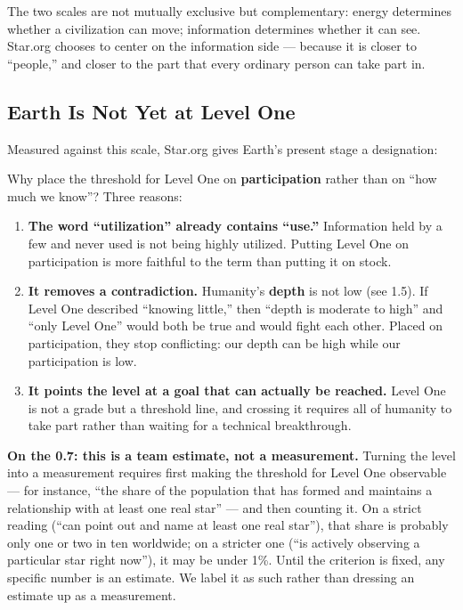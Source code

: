 \documentclass[11pt,fontset=none]{ctexart}
\begin{document}
The two scales are not mutually exclusive but complementary: energy determines whether a civilization can move; information determines whether it can see. Star.org chooses to center on the information side — because it is closer to ``people,'' and closer to the part that every ordinary person can take part in.

\subsection{Earth Is Not Yet at Level One}

Measured against this scale, Star.org gives Earth's present stage a designation:


Why place the threshold for Level One on \textbf{participation} rather than on ``how much we know''? Three reasons:

\begin{enumerate}
  \item \textbf{The word ``utilization'' already contains ``use.''} Information held by a few and never used is not being highly utilized. Putting Level One on participation is more faithful to the term than putting it on stock.
  \item \textbf{It removes a contradiction.} Humanity's \textbf{depth} is not low (see 1.5). If Level One described ``knowing little,'' then ``depth is moderate to high'' and ``only Level One'' would both be true and would fight each other. Placed on participation, they stop conflicting: our depth can be high while our participation is low.
  \item \textbf{It points the level at a goal that can actually be reached.} Level One is not a grade but a threshold line, and crossing it requires all of humanity to take part rather than waiting for a technical breakthrough.
\end{enumerate}

\textbf{On the 0.7: this is a team estimate, not a measurement.} Turning the level into a measurement requires first making the threshold for Level One observable --- for instance, ``the share of the population that has formed and maintains a relationship with at least one real star'' --- and then counting it. On a strict reading (``can point out and name at least one real star''), that share is probably only one or two in ten worldwide; on a stricter one (``is actively observing a particular star right now''), it may be under 1\%. Until the criterion is fixed, any specific number is an estimate. We label it as such rather than dressing an estimate up as a measurement.
\end{document}
